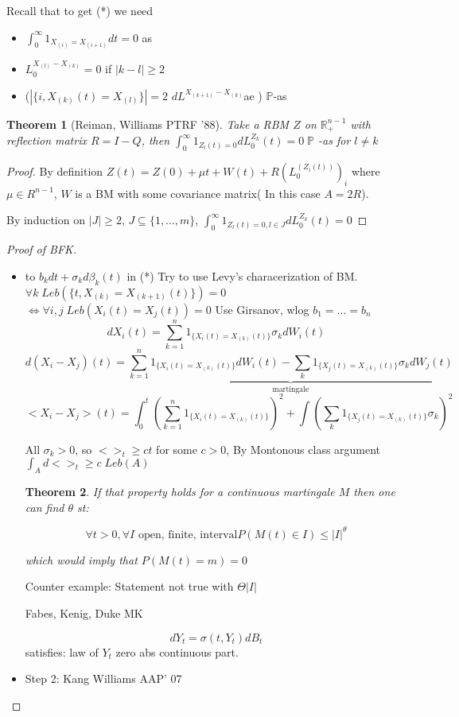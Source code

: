 \documentclass{article} \usepackage[utf8]{inputenc}
\newtheorem{theorem}{Theorem}
\begin{document}
Recall that to get (*) we need
\begin{itemize}
\item $\int_0^{\infty} 1_{X_{(i)} = X_{(i+1)} }dt = 0$ as
\item $L_0^{X_{(l)} - X_{(k)}} = 0$ if $|k - l| \ge 2$
\item ($|\{ i, X_{(k)}(t) = X_{(l)} \}| = 2$ $dL^{X_{(k+1)} - X_{(k)}}$ae ) $\mathbb P$-as
\end{itemize}
\begin{theorem}[Reiman, Williams PTRF '88]
  Take a RBM $Z$ on $\mathbb R_+^{n-1}$ with reflection matrix $R = I - Q$, then $\int_0^{\infty} 1_{Z_l(t) = 0} dL_0^{Z_k}(t) = 0 \; \mathbb P$ -as for $l \ne k$
\end{theorem}
\begin{proof}
  By definition $Z(t) = Z(0) + \mu t + W(t) + R(L_0^{(Z_i(t))})_i$ where $\mu \in R^{n-1}$, $W$ is a BM with some covariance matrix( In this case $A = 2R$).

  By induction on $|J| \ge 2$, $J \subseteq \{ 1, \ldots, m \}$, $\int_0^{\infty} 1_{Z_l(t) = 0, l \in J} dL_0^{Z_k}(t) = 0$
  
\end{proof}
\begin{proof}[Proof of BFK]
  \begin{itemize}
  \item to $b_k dt + \sigma_k d\beta_k(t)$ in (*) Try to use Levy's characerization of BM.
    $\forall k \; Leb(\{ t, X_{(k)} = X_{(k+1)}(t)  \}) = 0$ $\iff \forall i,j \; Leb(X_{i}(t) = X_{j}(t)) = 0$
    Use Girsanov, wlog $b_1 = \ldots = b_n$
    $$dX_i(t) = \sum_{k = 1}^n 1_{\{X_i(t) = X_{(k)}(t)\}} \sigma_k dW_i(t)$$
    $$d(X_i - X_j)(t) = \underbrace{\sum_{k = 1}^n 1_{\{X_i(t) = X_{(k)}(t)\}} dW_i(t) - \sum_k 1_{\{X_j(t) = X_{(k)}(t)\}} \sigma_k dW_j(t)}_{\text{martingale}}$$
    $$<X_i - X_j>(t) = \int_0^t (\sum_{k = 1}^n 1_{\{X_i(t) = X_{(k)}(t)\}})^2 + \int (\sum_k 1_{\{X_j(t) = X_{(k)}(t)\}} \sigma_k)^2 $$

    All $\sigma_k > 0$, so $<>_t \ge ct$ for some $c > 0$, By Montonous class argument $\int_A d<>_t \ge c \; Leb(A)$

    \begin{theorem}
      If that property holds for a continuous martingale $M$ then one can find $\theta$ st:
      
      $$\forall t > 0, \forall I \text{ open, finite, interval} P(M(t)
      \in I) \le |I|^{\theta}$$
      
      which would imply that $P(M(t) = m) = 0$
    \end{theorem}
    Counter example: Statement not true with $\Theta |I|$

    Fabes, Kenig, Duke MK
    
    $$dY_t = \sigma(t, Y_t)dB_t$$
    satisfies: law of $Y_t$ zero abs continuous part.
    
  \item Step 2: Kang Williams AAP' 07

  \end{itemize}
\end{proof}
\end{document}
